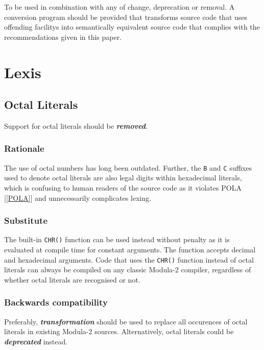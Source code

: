 \documentclass[10pt,a4paper]{article}
\renewcommand{\emph}[1]{\textbf{\textit{#1}}}
\begin{document}
To be used in combination with any of change, deprecation or removal.
A conversion program should be provided that transforms source code that uses
\glspl{offending facility} into semantically equivalent source code that
complies with the recommendations given in this paper.


\section{Lexis}

\subsection{Octal Literals}

Support for octal literals should be \emph{removed}.

\subsubsection{Rationale}

The use of octal numbers has long been outdated. Further, the \verb|B| and
\verb|C| suffixes used to denote octal literals are also legal digits within
hexadecimal literals, which is confusing to human readers of the source code as
it violates POLA [\ref{POLA}] and unnecessarily complicates lexing.

\subsubsection{Substitute}

The built-in \verb|CHR()| function can be used instead without penalty as it is
evaluated at compile time for constant arguments. The function accepts decimal
and hexadecimal arguments. Code that uses the \verb|CHR()| function instead of
octal literals can always be compiled on any classic Modula-2 compiler,
regardless of whether octal literals are recognised or not.

\subsubsection{Backwards compatibility}

Preferably, \emph{transformation} should be used to replace all occurences of
octal literals in existing Modula-2 sources. Alternatively, octal literals
could be \emph{deprecated} instead.
\end{document}
